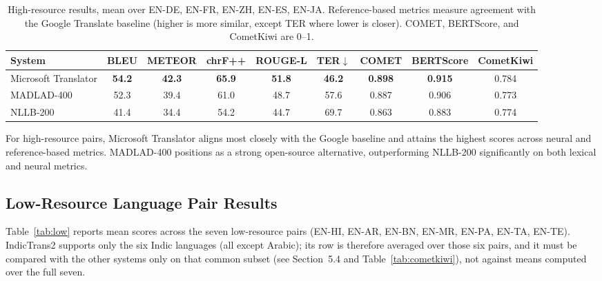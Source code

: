 \documentclass[pdflatex,sn-mathphys-num]{sn-jnl}
\begin{document}
\begin{table}[h]
\centering
\caption{High-resource results, mean over EN-DE, EN-FR, EN-ZH, EN-ES, EN-JA. Reference-based metrics measure agreement with the Google Translate baseline (higher is more similar, except TER where lower is closer). COMET, BERTScore, and CometKiwi are 0--1.}\label{tab:high}
\tiny
\setlength{\tabcolsep}{2pt}
\begin{tabular}{@{} p{2.2cm} c c c c c c c c @{}} 
\toprule
System & BLEU & METEOR & chrF++ & ROUGE-L & TER$\downarrow$ & COMET & BERTScore & CometKiwi \\
\midrule
Microsoft Translator & \textbf{54.2} & \textbf{42.3} & \textbf{65.9} & \textbf{51.8} & \textbf{46.2} & \textbf{0.898} & \textbf{0.915} & 0.784 \\
MADLAD-400 & 52.3 & 39.4 & 61.0 & 48.7 & 57.6 & 0.887 & 0.906 & 0.773 \\
NLLB-200 & 41.4 & 34.4 & 54.2 & 44.7 & 69.7 & 0.863 & 0.883 & 0.774 \\
\bottomrule
\end{tabular}
\end{table}

For high-resource pairs, Microsoft Translator aligns most closely with the Google baseline and attains the highest scores across neural and reference-based metrics. MADLAD-400 positions as a strong open-source alternative, outperforming NLLB-200 significantly on both lexical and neural metrics.

\subsection{Low-Resource Language Pair Results}

Table~\ref{tab:low} reports mean scores across the seven low-resource pairs (EN-HI, EN-AR, EN-BN, EN-MR, EN-PA, EN-TA, EN-TE). IndicTrans2 supports only the six Indic languages (all except Arabic); its row is therefore averaged over those six pairs, and it must be compared with the other systems only on that common subset (see Section~5.4 and Table~\ref{tab:cometkiwi}), not against means computed over the full seven.
\end{document}
